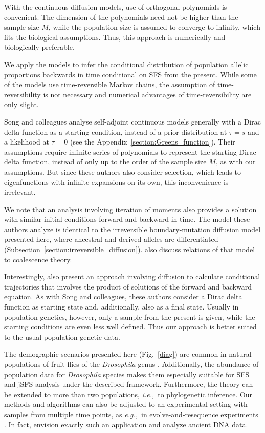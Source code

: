 \documentclass[preprint]{elsarticle}
\newcommand\eg{{\it e.g.,}}
\newcommand\ie{{\it i.e.,}}
\begin{document}
With the continuous diffusion models, use of orthogonal polynomials is convenient. The dimension of the polynomials need not be higher than the sample size $M$, while the population size is assumed to converge to infinity, which fits the biological assumptions. Thus, this approach is numerically and biologically preferable. 

We apply the models to infer the conditional distribution of population allelic proportions backwards in time conditional on SFS from the present. While some of the models use time-reversible Markov chains, the assumption of time-reversibility is not necessary and numerical advantages of time-reversibility are only slight.

Song and colleagues \citep{Song12,Stei13,Stei14,Zivk15} analyse self-adjoint continuous models generally with a Dirac delta function as a starting condition, instead of a prior distribution at $\tau=s$ and a likelihood at $\tau=0$ (see the Appendix~\ref{section:Greens_function}). Their assumptions require infinite series of polynomials to represent the starting Dirac delta function, instead of only up to the order of the sample size $M$, as with our assumptions. But since these authors also consider selection, which leads to eigenfunctions with infinite expansions on its own, this inconvenience is irrelevant. 

We note that an analysis involving iteration of moments \citep{Evan07,Zivk11} also provides a solution with similar initial conditions forward and backward in time. The model these authors analyze is identical to the irreversible boundary-mutation diffusion model presented here, where ancestral and derived alleles are differentiated (Subsection~\ref{section:irreversible_diffusion}). \citet{Zivk11} also discuss relations of that model to coalescence theory. 

Interestingly, \citet{Zhao13} also present an approach involving diffusion to calculate conditional trajectories that involves the product of solutions of the forward and backward equation. As with Song and colleagues, these authors consider a Dirac delta function as starting state and, additionally, also as a final state. Usually in population genetics, however, only a sample from the present is given, while the starting conditions are even less well defined. Thus our approach is better suited to the usual population genetic data. 

The demographic scenarios presented here (Fig.~\ref{diag}) are common in natural populations of fruit flies of the \textit{Drosophila} genus \citep[\eg][]{Li06,Zeng10a,Pool12}. Additionally, the abundance of population data for \textit{Drosophila} species makes them especially suitable for SFS and jSFS analysis under the described framework. Furthermore, the theory can be extended to more than two populations, \ie\ to phylogenetic inference. Our methods and algorithms can also be adjusted to an experimental setting with samples from multiple time points, as \eg\ in evolve-and-resequence experiments \citep{Kofl14}. In fact, \citet{Stei14} envision exactly such an application and analyze ancient DNA data. 
\end{document}
